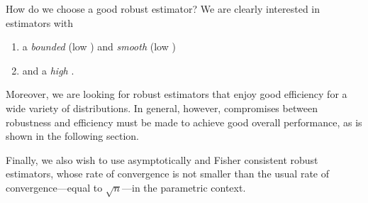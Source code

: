 How do we choose a good robust estimator? We are clearly interested in estimators with

\begin{enumerate}
    \item a \emph{bounded} (low )
    and \emph{smooth} (low ) \emph{} 

    \item and a \emph{high }.
\end{enumerate}

Moreover, we are looking for robust estimators that enjoy good efficiency for
a wide variety of distributions. In general, however, compromises between
robustness and efficiency must be made to achieve good overall performance, as
is shown in the following section.

Finally, we also wish to use asymptotically and Fisher consistent robust
estimators, whose rate of convergence is not smaller than the usual rate of
convergence---equal to $\sqrt{n}$---in the parametric context.


\endinput
